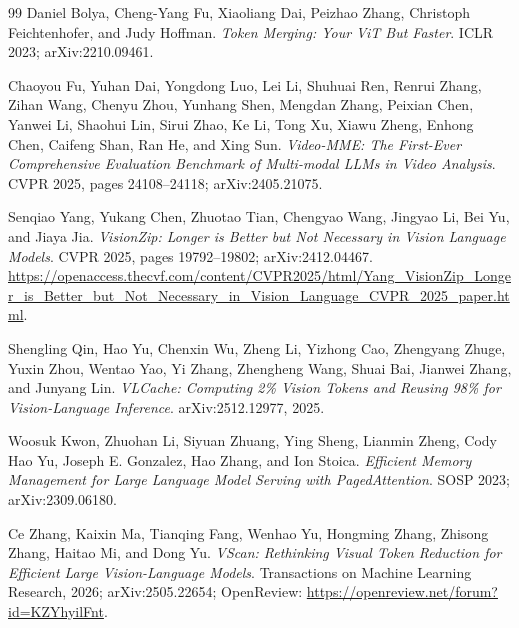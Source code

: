 \begin{thebibliography}{99}
Daniel Bolya, Cheng-Yang Fu, Xiaoliang Dai, Peizhao Zhang, Christoph
Feichtenhofer, and Judy Hoffman.
\emph{Token Merging: Your ViT But Faster}. ICLR 2023; arXiv:2210.09461.

Chaoyou Fu, Yuhan Dai, Yongdong Luo, Lei Li, Shuhuai Ren, Renrui Zhang, Zihan
Wang, Chenyu Zhou, Yunhang Shen, Mengdan Zhang, Peixian Chen, Yanwei Li,
Shaohui Lin, Sirui Zhao, Ke Li, Tong Xu, Xiawu Zheng, Enhong Chen, Caifeng
Shan, Ran He, and Xing Sun.
\emph{Video-MME: The First-Ever Comprehensive Evaluation Benchmark of
Multi-modal LLMs in Video Analysis}. CVPR 2025, pages 24108--24118;
arXiv:2405.21075.

Senqiao Yang, Yukang Chen, Zhuotao Tian, Chengyao Wang, Jingyao Li, Bei Yu,
and Jiaya Jia.
\emph{VisionZip: Longer is Better but Not Necessary in Vision Language
Models}. CVPR 2025, pages 19792--19802; arXiv:2412.04467.
\url{https://openaccess.thecvf.com/content/CVPR2025/html/Yang_VisionZip_Longer_is_Better_but_Not_Necessary_in_Vision_Language_CVPR_2025_paper.html}.

Shengling Qin, Hao Yu, Chenxin Wu, Zheng Li, Yizhong Cao, Zhengyang Zhuge,
Yuxin Zhou, Wentao Yao, Yi Zhang, Zhengheng Wang, Shuai Bai, Jianwei Zhang,
and Junyang Lin.
\emph{VLCache: Computing 2\% Vision Tokens and Reusing 98\% for
Vision-Language Inference}. arXiv:2512.12977, 2025.

Woosuk Kwon, Zhuohan Li, Siyuan Zhuang, Ying Sheng, Lianmin Zheng, Cody Hao
Yu, Joseph E. Gonzalez, Hao Zhang, and Ion Stoica.
\emph{Efficient Memory Management for Large Language Model Serving with
PagedAttention}. SOSP 2023; arXiv:2309.06180.

Ce Zhang, Kaixin Ma, Tianqing Fang, Wenhao Yu, Hongming Zhang, Zhisong Zhang,
Haitao Mi, and Dong Yu.
\emph{VScan: Rethinking Visual Token Reduction for Efficient Large
Vision-Language Models}. Transactions on Machine Learning Research, 2026;
arXiv:2505.22654; OpenReview:
\url{https://openreview.net/forum?id=KZYhyilFnt}.

\end{thebibliography}
